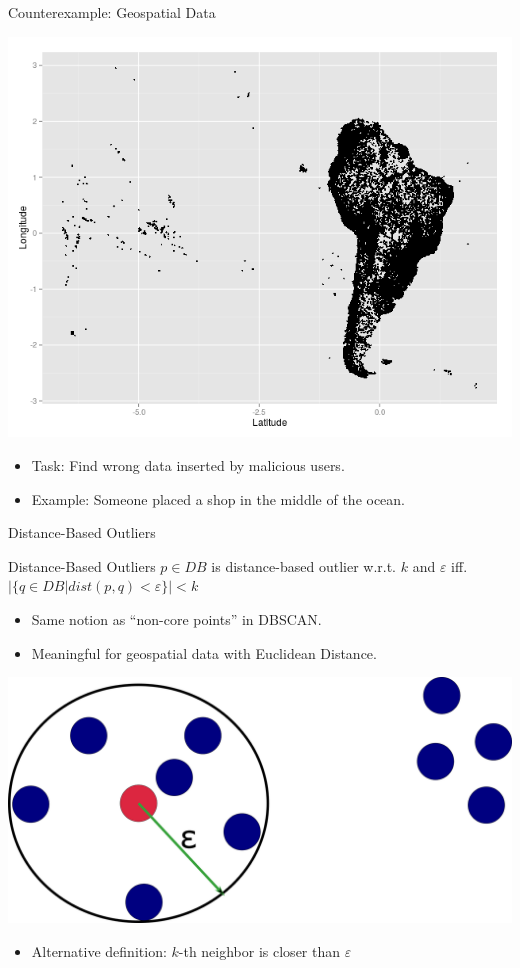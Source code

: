 \documentclass{beamer}
\begin{document}
\begin{frame}{Counterexample: Geospatial Data}
    \begin{center}
    \includegraphics[width=.7\textwidth]{images/south_america.png} 
    \end{center}
    \begin{itemize}
        \item Task: Find wrong data inserted by malicious users.

        \item Example: Someone placed a shop in the middle of the ocean.

    \end{itemize}
\end{frame}
\begin{frame}{Distance-Based Outliers}
    \begin{block}{Distance-Based Outliers}
        $p\in DB$ is distance-based outlier w.r.t. $k$ and $\varepsilon$
        iff. $|\{q\in DB | dist(p,q) < \varepsilon\}| < k$
    \end{block}

    \begin{itemize}
        \item Same notion as ``non-core points'' in DBSCAN.
        \item Meaningful for geospatial data with Euclidean Distance.
    \end{itemize}
    \includegraphics[width=.5\textwidth]{images/dboutliers.png}
    \begin{itemize}
        \item Alternative definition: $k$-th neighbor is closer than $\varepsilon$
    \end{itemize}
    
\end{frame}
\end{document}
